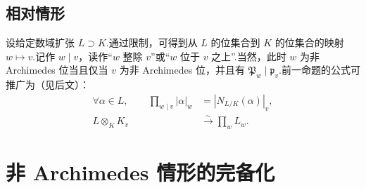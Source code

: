\subsection{相对情形}\label{sec:nt-4-1-8}
设给定数域扩张 $L\supset K$.通过限制，可得到从 $L$ 的位集合到 $K$ 的位集合的映射 $w\mapsto v$.记作 $w\mid v$，读作``$w$ 整除 $v$''或``$w$ 位于 $v$ 之上''.当然，此时 $w$ 为非 Archimedes 位当且仅当 $v$ 为非 Archimedes 位，并且有 $\mathfrak P_w\mid\mathfrak p_v$.前一命题的公式可推广为（见后文）：
\begin{align*}
\forall\alpha\in L,\qquad\prod_{w\mid v}|\alpha|_w&=|N_{L/K}(\alpha)|_v,\\
L\otimes_K K_v&\xrightarrow{\sim}\prod_wL_w.
\end{align*}

\section{非 Archimedes 情形的完备化}\label{sec:nt-4-2}
